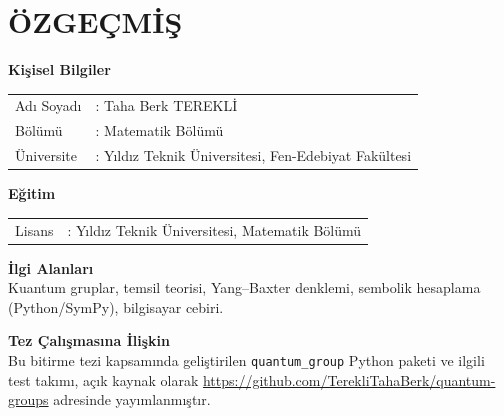 \documentclass[12pt,a4paper]{report}
\numberwithin{equation}{chapter}
\theoremstyle{plain}
\theoremstyle{definition}
\begin{document}
\clearpage
\chapter{ÖZGEÇMİŞ}

\noindent
\textbf{Kişisel Bilgiler}\\[4pt]
\begin{tabularx}{\textwidth}{@{}p{4cm}X@{}}
Adı Soyadı      & : Taha Berk TEREKLİ \\
Bölümü          & : Matematik Bölümü \\
Üniversite      & : Yıldız Teknik Üniversitesi, Fen-Edebiyat Fakültesi \\
\end{tabularx}

\vspace{0.6cm}
\noindent
\textbf{Eğitim}\\[4pt]
\begin{tabularx}{\textwidth}{@{}p{4cm}X@{}}
Lisans & : Yıldız Teknik Üniversitesi, Matematik Bölümü \\
\end{tabularx}

\vspace{0.6cm}
\noindent
\textbf{İlgi Alanları}\\[4pt]
Kuantum gruplar, temsil teorisi, Yang--Baxter denklemi, sembolik hesaplama
(Python/SymPy), bilgisayar cebiri.

\vspace{0.6cm}
\noindent
\textbf{Tez Çalışmasına İlişkin}\\[4pt]
Bu bitirme tezi kapsamında geliştirilen \texttt{quantum\_group} Python paketi ve
ilgili test takımı, açık kaynak olarak
\url{https://github.com/TerekliTahaBerk/quantum-groups} adresinde
yayımlanmıştır.
\end{document}
